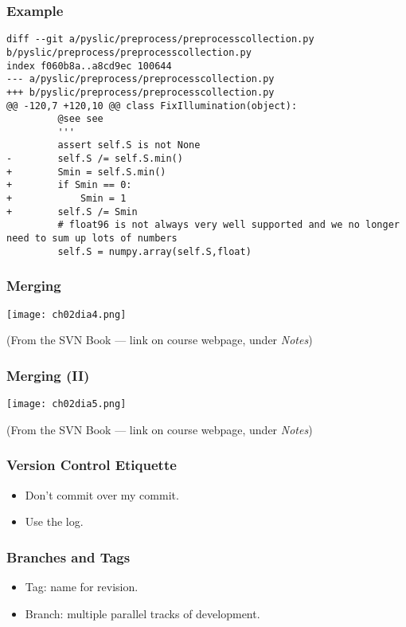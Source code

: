 \begin{frame}[fragile]
\frametitle{Example}

\begin{verbatim}
diff --git a/pyslic/preprocess/preprocesscollection.py b/pyslic/preprocess/preprocesscollection.py
index f060b8a..a8cd9ec 100644
--- a/pyslic/preprocess/preprocesscollection.py
+++ b/pyslic/preprocess/preprocesscollection.py
@@ -120,7 +120,10 @@ class FixIllumination(object):
         @see see
         '''
         assert self.S is not None
-        self.S /= self.S.min()
+        Smin = self.S.min()
+        if Smin == 0:
+            Smin = 1
+        self.S /= Smin
         # float96 is not always very well supported and we no longer need to sum up lots of numbers
         self.S = numpy.array(self.S,float)
\end{verbatim}

\end{frame}

\begin{frame}[fragile]
\frametitle{Merging}

\centering
\texttt{[image: ch02dia4.png]}

\begin{flushright}
(From the SVN Book --- link on course webpage, under \textit{Notes})
\end{flushright}

\end{frame}

\begin{frame}[fragile]
\frametitle{Merging (II)}

\centering
\texttt{[image: ch02dia5.png]}

\begin{flushright}
(From the SVN Book --- link on course webpage, under \textit{Notes})
\end{flushright}

\end{frame}

\begin{frame}[fragile]
\frametitle{Version Control Etiquette}
\begin{itemize}
\item Don't commit over my commit.
\item Use the log.
\end{itemize}
\end{frame}

\begin{frame}[fragile]
\frametitle{Branches and Tags}
\begin{itemize}
\item Tag: name for revision.
\item Branch: multiple parallel tracks of development.
\end{itemize}

\end{frame}

